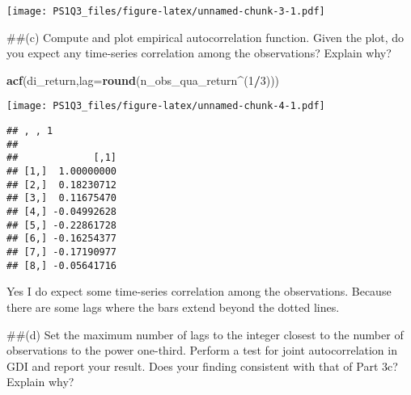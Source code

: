 \documentclass[
]{article}
\newenvironment{Shaded}{\begin{snugshade}}{\end{snugshade}}
\newcommand{\AttributeTok}[1]{\textcolor[rgb]{0.13,0.29,0.53}{#1}}
\newcommand{\ConstantTok}[1]{\textcolor[rgb]{0.56,0.35,0.01}{#1}}
\newcommand{\DecValTok}[1]{\textcolor[rgb]{0.00,0.00,0.81}{#1}}
\newcommand{\FunctionTok}[1]{\textcolor[rgb]{0.13,0.29,0.53}{\textbf{#1}}}
\newcommand{\NormalTok}[1]{#1}
\newcommand{\OtherTok}[1]{\textcolor[rgb]{0.56,0.35,0.01}{#1}}
\newcommand{\SpecialCharTok}[1]{\textcolor[rgb]{0.81,0.36,0.00}{\textbf{#1}}}
\begin{document}
\texttt{[image: PS1Q3\_files/figure-latex/unnamed-chunk-3-1.pdf]}

\#\#(c) Compute and plot empirical autocorrelation function. Given the
plot, do you expect any time-series correlation among the observations?
Explain why?

\begin{Shaded}
\begin{Highlighting}[]
\FunctionTok{acf}\NormalTok{(di\_return,}\AttributeTok{lag=}\FunctionTok{round}\NormalTok{(n\_obs\_qua\_return}\SpecialCharTok{\^{}}\NormalTok{(}\DecValTok{1}\SpecialCharTok{/}\DecValTok{3}\NormalTok{)))}
\end{Highlighting}
\end{Shaded}

\texttt{[image: PS1Q3\_files/figure-latex/unnamed-chunk-4-1.pdf]}

\begin{Shaded}
\end{Shaded}

\begin{verbatim}
## , , 1
## 
##             [,1]
## [1,]  1.00000000
## [2,]  0.18230712
## [3,]  0.11675470
## [4,] -0.04992628
## [5,] -0.22861728
## [6,] -0.16254377
## [7,] -0.17190977
## [8,] -0.05641716
\end{verbatim}

Yes I do expect some time-series correlation among the observations.
Because there are some lags where the bars extend beyond the dotted
lines.

\#\#(d) Set the maximum number of lags to the integer closest to the
number of observations to the power one-third. Perform a test for joint
autocorrelation in GDI and report your result. Does your finding
consistent with that of Part 3c? Explain why?

\begin{Shaded}
\end{Shaded}
\end{document}
